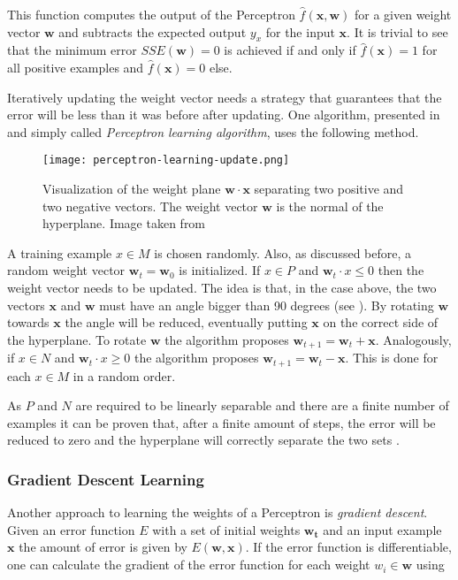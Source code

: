 This function computes the output of the Perceptron $\hat{f}(\bm{x}, \bm{w})$ for a given weight vector $\bm{w}$ and subtracts the expected output $y_x$ for the input $\bm{x}$.
It is trivial to see that the minimum error $SSE(\bm{w}) = 0$ is achieved if and only if $\hat{f}(\bm{x}) = 1$ for all positive examples and $\hat{f}(\bm{x}) = 0$ else.

Iteratively updating the weight vector needs a strategy that guarantees that the error will be less than it was before after updating.
One algorithm, presented in \cite{rojas_neural_1996} and simply called \textit{Perceptron learning algorithm}, uses the following method.

\begin{figure}[htb!]
    \centering
    \texttt{[image: perceptron-learning-update.png]}
    \caption{Visualization of the weight plane $\bm{w} \cdot \bm{x}$ separating two positive and two negative vectors. The weight vector $\bm{w}$ is the normal of the hyperplane. Image taken from \cite{rojas_neural_1996}}
    \label{fig:perceptron-learning-update}
\end{figure}

A training example $x \in M$ is chosen randomly.
Also, as discussed before, a random weight vector $\bm{w}_t = \bm{w}_0$ is initialized.
If $x \in P$ and $\bm{w}_t \cdot x \leq 0$ then the weight vector needs to be updated.
The idea is that, in the case above, the two vectors $\bm{x}$ and $\bm{w}$ must have an angle bigger than 90 degrees (see ).
By rotating $\bm{w}$ towards $\bm{x}$ the angle will be reduced, eventually putting $\bm{x}$ on the correct side of the hyperplane.
To rotate $\bm{w}$ the algorithm proposes $\bm{w}_{t+1} = \bm{w}_{t} + \bm{x}$.
Analogously, if $x \in N$ and $\bm{w}_t \cdot x \geq 0$ the algorithm proposes $\bm{w}_{t+1} = \bm{w}_{t} - \bm{x}$.
This is done for each $x \in M$ in a random order.

As $P$ and $N$ are required to be linearly separable and there are a finite number of examples it can be proven that, after a finite amount of steps, the error will be reduced to zero and the hyperplane will correctly separate the two sets \cite{rojas_neural_1996}.

\subsubsection{Gradient Descent Learning}

Another approach to learning the weights of a Perceptron is \textit{gradient descent}.
Given an error function $E$ with a set of initial weights $\bm{w_t}$ and an input example $\bm{x}$ the amount of error is given by $E(\bm{w}, \bm{x})$.
If the error function is differentiable, one can calculate the gradient of the error function for each weight $w_i \in \bm{w}$ using

